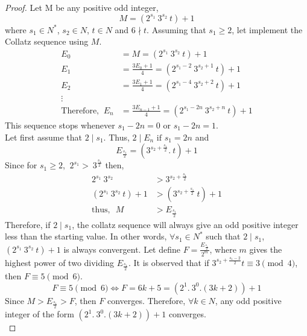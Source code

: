 \documentclass[14pt,a4paper]{article}
\theoremstyle{plain}
\begin{document}
\begin{proof}
    Let M be any positive odd integer, 
    \begin{equation}
        M = (2^{s_{1}}~3^{s_{2}}~t) +1 
    \end{equation}
    where $s_{1} \in N^{*}$, $s_{2} \in N$, $t \in N $ and $6\nmid t$. Assuming that $s_{1} \geq 2$, let implement the Collatz sequence using $M$.
    \begin{align}
        E_{0} & = M = (2^{s_{1}}~3^{s_{2}}~t) +1 \\
        E_{1} &= \frac{3E_{0}+1}{4}= (2^{s_{1}-2}~3^{s_{2}+ 1}~t) + 1
        \\
        E_{2} &= \frac{3E_{1}+1}{4} = (2^{s_{1}-4}~3^{s_{2}+ 2}~t) + 1 
        \\
        \vdots
        \\
        \text{Therefore, } ~E_{n} &= \frac{3E_{n-1}+1}{4} = (2^{s_{1}-2n}~3^{s_{2}+ n}~t) + 1
    \end{align}
    This sequence stops whenever $s_{1}-2n = 0$ or $s_{1}-2n=1$. \\
    
    Let first assume that $2 \mid s_{1}$. Thus, $ 2 \mid E_{n} \text{ if } s_{1} = 2n$ and
    \begin{equation}
        E_{\frac{s_{1}}{2}} = (3^{s_{2}+\frac{s_{1}}{2}}.~t) + 1 
    \end{equation}
     Since for $s_{1}\geq 2$, $ ~2^{s_{1}} >~ 3^{\frac{s_{1}}{2}}$ then, 
    \begin{align}
        2^{s_{1}}~3^{s_{2}} &> 3^{s_{2}+\frac{s_{1}}{2}} \\
        (2^{s_{1}}~3^{s_{2}}~t)+1 &> (3^{s_{2}+\frac{s_{1}}{2}}~t)+1 \\
        \text{thus, ~} M &> E_{\frac{s_{1}}{2}}
    \end{align}
    Therefore, if $2\mid s_{1}$, the collatz sequence will always give an odd positive integer less than the starting value. In other words, $\forall s_{1} \in N^{*}$ such that $2\mid s_{1}$, $(2^{s_{1}}~3^{s_{2}}~t)+1$ is always convergent. Let define $F = \frac{E_{\frac{s_{1}}{2}}}{2^{m}}$, where $m$ gives the highest power of two dividing $E_{\frac{s_{1}}{2}}$. It is observed that if $3^{s_{2}+\frac{s_{1}-2}{2}}t \equiv 3 \pmod{4}$, then $F\equiv 5 \pmod{6}$.
    \begin{equation}
       F\equiv 5 \pmod{6} \Leftrightarrow F = 6k+5=(2^{1}.~3^{0}.(3k+2))+1
    \end{equation}
    Since $M> E_{\frac{s_{1}}{2}} >F$, then $F$ converges. Therefore, $\forall k \in N$,  any odd positive integer of the form $(2^{1}.~3^{0}.(3k+2))+1$ converges.\\ 
    

\end{proof}
\end{document}
